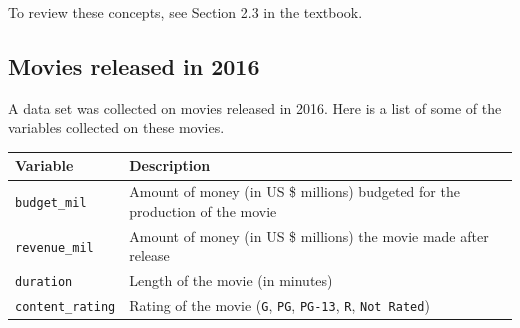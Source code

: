 \documentclass[
]{report}
\begin{document}
To review these concepts, see Section 2.3 in the textbook.

\hypertarget{movies-released-in-2016}{%
\subsection{Movies released in 2016}\label{movies-released-in-2016}}

A data set was collected on movies released in 2016. Here is a list of some of the variables collected on these movies.

\begin{longtable}[]{@{}ll@{}}
\toprule
\begin{minipage}[b]{0.22\columnwidth}\raggedright
\textbf{Variable}\strut
\end{minipage} & \begin{minipage}[b]{0.72\columnwidth}\raggedright
\textbf{Description}\strut
\end{minipage}\tabularnewline
\midrule
\endhead
\begin{minipage}[t]{0.22\columnwidth}\raggedright
\texttt{budget\_mil}\strut
\end{minipage} & \begin{minipage}[t]{0.72\columnwidth}\raggedright
Amount of money (in US \$ millions) budgeted for the production of the movie\strut
\end{minipage}\tabularnewline
\begin{minipage}[t]{0.22\columnwidth}\raggedright
\texttt{revenue\_mil}\strut
\end{minipage} & \begin{minipage}[t]{0.72\columnwidth}\raggedright
Amount of money (in US \$ millions) the movie made after release\strut
\end{minipage}\tabularnewline
\begin{minipage}[t]{0.22\columnwidth}\raggedright
\texttt{duration}\strut
\end{minipage} & \begin{minipage}[t]{0.72\columnwidth}\raggedright
Length of the movie (in minutes)\strut
\end{minipage}\tabularnewline
\begin{minipage}[t]{0.22\columnwidth}\raggedright
\texttt{content\_rating}\strut
\end{minipage} & \begin{minipage}[t]{0.72\columnwidth}\raggedright
Rating of the movie (\texttt{G}, \texttt{PG}, \texttt{PG-13}, \texttt{R}, \texttt{Not\ Rated})\strut
\end{minipage}\tabularnewline

\end{longtable}
\end{document}
